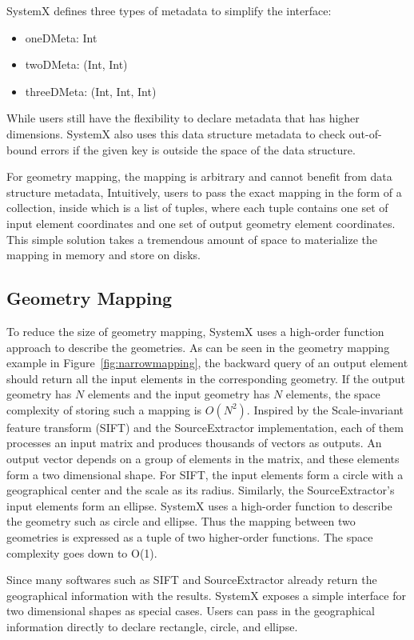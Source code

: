 \documentclass{sig-alternate}
\newenvironment{shortlist}{
        \vspace*{-0.5em}
  \begin{itemize}
  \setlength{\itemsep}{-0.1em}
}{
  \end{itemize}
        \vspace*{-0.5em}
}
\begin{document}
SystemX defines three types of metadata to simplify the interface:
\begin{shortlist}
\item{} oneDMeta: Int
\item{} twoDMeta: (Int, Int)
\item{} threeDMeta: (Int, Int, Int)
\end{shortlist}  
While users still have the flexibility to declare metadata that has higher dimensions.
SystemX also uses this data structure metadata to check out-of-bound errors if the given key is outside the space of the data structure.

For geometry mapping, the mapping is arbitrary and cannot benefit from data structure metadata, 
Intuitively, users to pass the exact mapping in the form of a collection, inside which is a list of tuples, where each tuple 
contains one set of input element coordinates and one set of output geometry element coordinates. 
This simple solution takes a tremendous amount of space to materialize the mapping in memory and store on disks.

\subsection{Geometry Mapping}
\label{sec:Design-GeometryMapping}
To reduce the size of geometry mapping, SystemX uses a high-order function approach to describe the geometries.
As can be seen in the geometry mapping example in Figure~\ref{fig:narrowmapping}, the backward query of an output element should return all the input elements in the corresponding geometry. If the output geometry has $N$ elements and the input geometry has $N$ elements, the space complexity of storing such a mapping is $O(N^2)$. 
Inspired by the Scale-invariant feature transform (SIFT) and the SourceExtractor implementation, each of them processes an input matrix and produces thousands of vectors as outputs. An output vector depends on a group of elements in the matrix, and these elements form a two dimensional shape. 
For SIFT, the input elements form a circle with a geographical center and the scale as its radius.
Similarly, the SourceExtractor's input elements form an ellipse. 
SystemX uses a high-order function to describe the geometry such as circle and ellipse. 
Thus the mapping between two geometries is expressed as a tuple of two higher-order functions.
The space complexity goes down to O(1).

Since many softwares such as SIFT and SourceExtractor already return the geographical information with the results.
SystemX exposes a simple interface for two dimensional shapes as special cases.
Users can pass in the geographical information directly to declare rectangle, circle, and ellipse.
\end{document}

